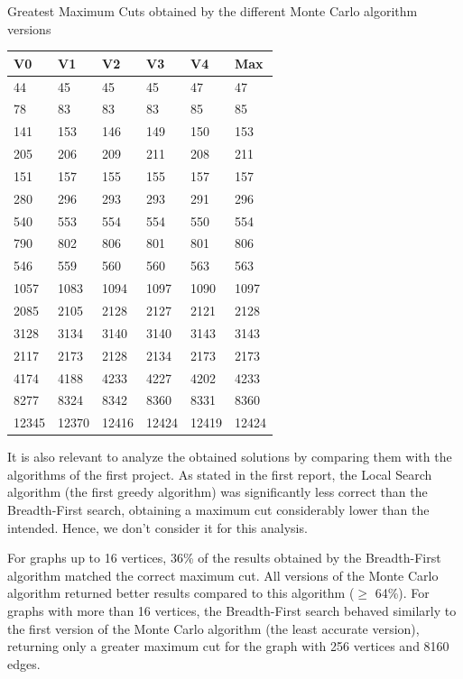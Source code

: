 \documentclass[]{revdetua}
\begin{document}
\begin{table}[!ht]
    \centering
    Greatest Maximum Cuts obtained by the different Monte Carlo algorithm versions
    \begin{tabular}{|l|l|l|l|l|l|}
    \hline
        V0 & V1 & V2 & V3 & V4 & Max \\ \hline
        44 & 45 & 45 & 45 & 47 & 47 \\ \hline
        78 & 83 & 83 & 83 & 85 & 85 \\ \hline
        141 & 153 & 146 & 149 & 150 & 153 \\ \hline
        205 & 206 & 209 & 211 & 208 & 211 \\ \hline
        151 & 157 & 155 & 155 & 157 & 157 \\ \hline
        280 & 296 & 293 & 293 & 291 & 296 \\ \hline
        540 & 553 & 554 & 554 & 550 & 554 \\ \hline
        790 & 802 & 806 & 801 & 801 & 806 \\ \hline
        546 & 559 & 560 & 560 & 563 & 563 \\ \hline
        1057 & 1083 & 1094 & 1097 & 1090 & 1097 \\ \hline
        2085 & 2105 & 2128 & 2127 & 2121 & 2128 \\ \hline
        3128 & 3134 & 3140 & 3140 & 3143 & 3143 \\ \hline
        2117 & 2173 & 2128 & 2134 & 2173 & 2173 \\ \hline
        4174 & 4188 & 4233 & 4227 & 4202 & 4233 \\ \hline
        8277 & 8324 & 8342 & 8360 & 8331 & 8360 \\ \hline
        12345 & 12370 & 12416 & 12424 & 12419 & 12424 \\ \hline
    \end{tabular}
\end{table}

It is also relevant to analyze the obtained solutions by comparing them with the algorithms of the first project. As stated in the first report, the Local Search algorithm (the first greedy algorithm) was significantly less correct than the Breadth-First search, obtaining a maximum cut considerably lower than the intended. Hence, we don't consider it for this analysis. 

For graphs up to 16 vertices, 36\% of the results obtained by the Breadth-First algorithm matched the correct maximum cut. All versions of the Monte Carlo algorithm returned better results compared to this algorithm ($\geq$ 64\%). For graphs with more than 16 vertices, the Breadth-First search behaved similarly to the first version of the Monte Carlo algorithm (the least accurate version), returning only a greater maximum cut for the graph with 256 vertices and 8160 edges.
\end{document}
